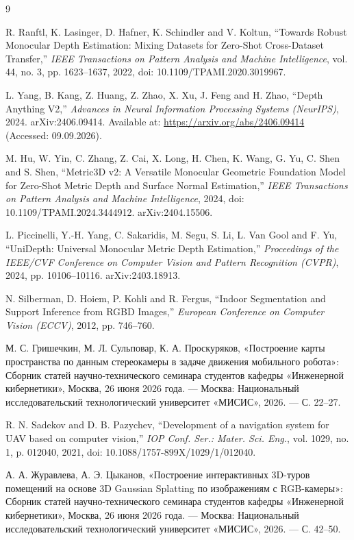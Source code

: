 \documentclass{misisarticle}
\begin{document}
\begin{thebibliography}{9}

 R. Ranftl, K. Lasinger, D. Hafner, K. Schindler and V. Koltun, ``Towards Robust Monocular Depth Estimation: Mixing Datasets for Zero-Shot Cross-Dataset Transfer,'' \textit{IEEE Transactions on Pattern Analysis and Machine Intelligence}, vol. 44, no. 3, pp. 1623--1637, 2022, doi: 10.1109/TPAMI.2020.3019967.

 L. Yang, B. Kang, Z. Huang, Z. Zhao, X. Xu, J. Feng and H. Zhao, ``Depth Anything V2,'' \textit{Advances in Neural Information Processing Systems (NeurIPS)}, 2024. arXiv:2406.09414. Available at: \url{https://arxiv.org/abs/2406.09414} (Accessed: 09.09.2026).

 M. Hu, W. Yin, C. Zhang, Z. Cai, X. Long, H. Chen, K. Wang, G. Yu, C. Shen and S. Shen, ``Metric3D v2: A Versatile Monocular Geometric Foundation Model for Zero-Shot Metric Depth and Surface Normal Estimation,'' \textit{IEEE Transactions on Pattern Analysis and Machine Intelligence}, 2024, doi: 10.1109/TPAMI.2024.3444912. arXiv:2404.15506.

 L. Piccinelli, Y.-H. Yang, C. Sakaridis, M. Segu, S. Li, L. Van Gool and F. Yu, ``UniDepth: Universal Monocular Metric Depth Estimation,'' \textit{Proceedings of the IEEE/CVF Conference on Computer Vision and Pattern Recognition (CVPR)}, 2024, pp. 10106--10116. arXiv:2403.18913.

 N. Silberman, D. Hoiem, P. Kohli and R. Fergus, ``Indoor Segmentation and Support Inference from RGBD Images,'' \textit{European Conference on Computer Vision (ECCV)}, 2012, pp. 746--760.

 М. С. Гришечкин, М. Л. Сульповар, К. А. Проскуряков, «Построение карты пространства по данным стереокамеры в задаче движения мобильного робота»: Сборник статей научно-технического семинара студентов кафедры «Инженерной кибернетики», Москва, 26 июня 2026 года. --- Москва: Национальный исследовательский технологический университет «МИСИС», 2026. --- С. 22--27.

 R. N. Sadekov and D. B. Pazychev, ``Development of a navigation system for UAV based on computer vision,'' \textit{IOP Conf. Ser.: Mater. Sci. Eng.}, vol. 1029, no. 1, p. 012040, 2021, doi: 10.1088/1757-899X/1029/1/012040.

 А. А. Журавлева, А. Э. Цыканов, «Построение интерактивных 3D-туров помещений на основе 3D Gaussian Splatting по изображениям с RGB-камеры»: Сборник статей научно-технического семинара студентов кафедры «Инженерной кибернетики», Москва, 26 июня 2026 года. --- Москва: Национальный исследовательский технологический университет «МИСИС», 2026. --- С. 42--50.


\end{thebibliography}
\end{document}
